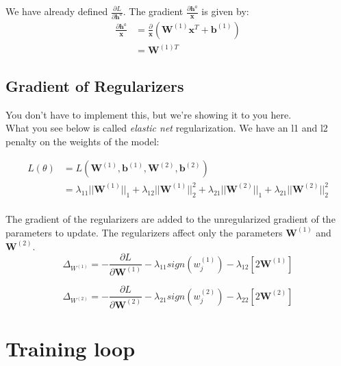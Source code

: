 \documentclass[reqno]{amsart}
\theoremstyle{definition}
\theoremstyle{remark}
\numberwithin{equation}{section}
\begin{document}
We have already defined $\frac{\partial L}{\partial \mathbf{h}^a}$. The gradient $\frac{\partial \mathbf{h}^a}{ \mathbf{x}}$ is given by: \\

\begin{align}
    \frac{\partial \mathbf{h}^a}{ \mathbf{x}} &= \frac{\partial}{\mathbf{x}} (\mathbf{W}^{(1)} \mathbf{x}^T+ \mathbf{b}^{(1)}) \\
    &= \mathbf{W}^{(1)T}
\end{align}

\subsection{Gradient of Regularizers}

You don't have to implement this, but we're showing it to you here. \\

What you see below is called \textit{elastic net} regularization. We have an
l1 and l2 penalty on the weights of the model:

\begin{align}
    L(\theta) &= L(\mathbf{W}^{(1)}, \mathbf{b}^{(1)}, \mathbf{W}^{(2)}, \mathbf{b}^{(2)}) \\
    &= \lambda_{11} ||\mathbf{W}^{(1)}||_1 + \lambda_{12} ||\mathbf{W}^{(1)}||_2^2 + \lambda_{21} ||\mathbf{W}^{(2)}||_1 + \lambda_{21} ||\mathbf{W}^{(2)}||_2^2
\end{align}\\

The gradient of the regularizers are added to the unregularized gradient of the
parameters to update. The regularizers affect only the parameters
$\mathbf{W}^{(1)}$ and $\mathbf{W}^{(2)}$. \\

\begin{equation}
    \Delta_{W^{(1)}} = - \frac{\partial L}{\partial \mathbf{W}^{(1)}} - \lambda_{11}sign(w^{(1)}_j) - \lambda_{12}[2\mathbf{W}^{(1)}]
\end{equation}

\begin{equation}
    \Delta_{W^{(2)}} = - \frac{\partial L}{\partial \mathbf{W}^{(2)}} - \lambda_{21}sign(w^{(2)}_j) - \lambda_{22}[2\mathbf{W}^{(2)}]
\end{equation}

\section{Training loop}
\end{document}

